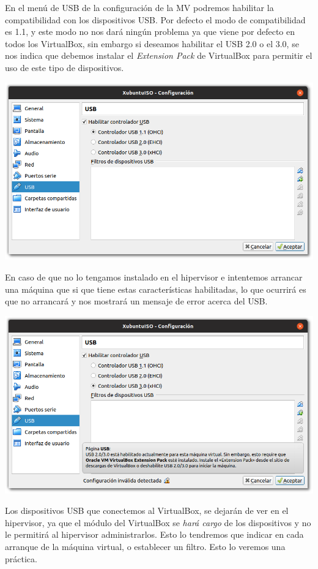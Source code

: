 \documentclass[11pt]{article}
\begin{document}
En el menú de USB de la configuración de la MV podremos habilitar la
compatibilidad con los dispositivos USB. Por defecto el modo de
compatibilidad es 1.1, y este modo no nos dará ningún problema ya que
viene por defecto en todos los VirtualBox, sin embargo si deseamos
habilitar el USB 2.0 o el 3.0, se nos indica que debemos instalar el
\emph{Extension Pack} de VirtualBox para permitir el uso de este tipo de
dispositivos.

\begin{center}
\includegraphics[width=.9\linewidth]{imgs/VBox_USB_1.png}
\end{center}

En caso de que no lo tengamos instalado en el hipervisor e intentemos
arrancar una máquina que si que tiene estas características habilitadas,
lo que ocurrirá es que no arrancará y nos mostrará un mensaje de error
acerca del USB.

\begin{center}
\includegraphics[width=.9\linewidth]{imgs/VBox_USB_2.png}
\end{center}

Los dispositivos USB que conectemos al VirtualBox, se dejarán de ver en
el hipervisor, ya que el módulo del VirtualBox se \emph{hará cargo} de los
dispositivos y no le permitirá al hipervisor administrarlos. Esto lo
tendremos que indicar en cada arranque de la máquina virtual, o
establecer un filtro. Esto lo veremos una práctica.
\end{document}
